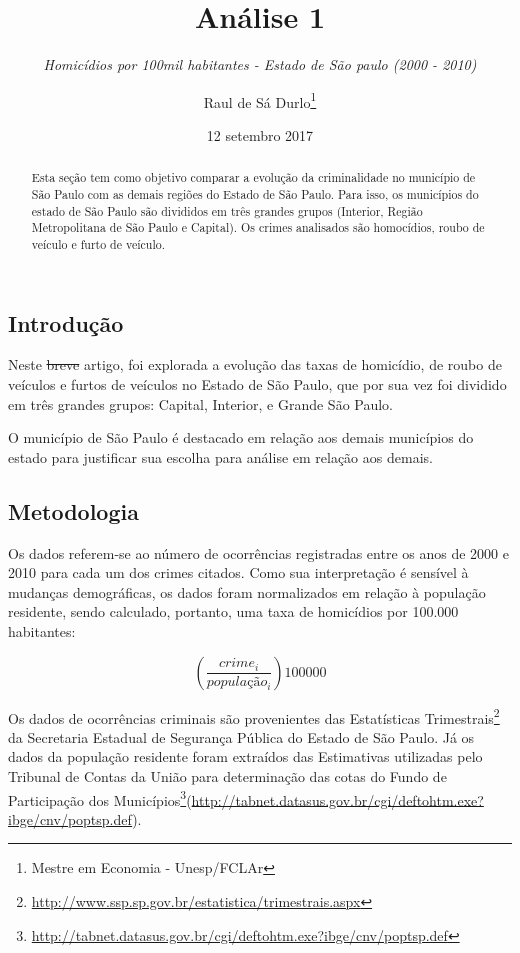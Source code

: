 \documentclass[]{article}
\title{Análise 1}
\subtitle{\emph{Homicídios por 100mil habitantes - Estado de São paulo (2000 -
2010)}}
\author{Raul de Sá Durlo\footnote{Mestre em Economia - Unesp/FCLAr}}
\date{12 setembro 2017}
\let\rmarkdownfootnote\footnote%
\def\footnote{\protect\rmarkdownfootnote}
\begin{document}
\maketitle
\begin{abstract}
Esta seção tem como objetivo comparar a evolução da criminalidade no
município de São Paulo com as demais regiões do Estado de São Paulo.
Para isso, os municípios do estado de São Paulo são divididos em três
grandes grupos (Interior, Região Metropolitana de São Paulo e Capital).
Os crimes analisados são homocídios, roubo de veículo e furto de
veículo.
\end{abstract}

\subsection{Introdução}\label{introducao}

Neste \sout{breve} artigo, foi explorada a evolução das taxas de
homicídio, de roubo de veículos e furtos de veículos no Estado de São
Paulo, que por sua vez foi dividido em três grandes grupos: Capital,
Interior, e Grande São Paulo.

O município de São Paulo é destacado em relação aos demais municípios do
estado para justificar sua escolha para análise em relação aos demais.

\subsection{Metodologia}\label{metodologia}

Os dados referem-se ao número de ocorrências registradas entre os anos
de 2000 e 2010 para cada um dos crimes citados. Como sua interpretação é
sensível à mudanças demográficas, os dados foram normalizados em relação
à população residente, sendo calculado, portanto, uma taxa de homicídios
por 100.000 habitantes:

\[\left(\frac{crime_i}{população_i}\right)100000\]

Os dados de ocorrências criminais são provenientes das Estatísticas
Trimestrais\footnote{\url{http://www.ssp.sp.gov.br/estatistica/trimestrais.aspx}}
da Secretaria Estadual de Segurança Pública do Estado de São Paulo. Já
os dados da população residente foram extraídos das Estimativas
utilizadas pelo Tribunal de Contas da União para determinação das cotas
do Fundo de Participação dos Municípios\footnote{\url{http://tabnet.datasus.gov.br/cgi/deftohtm.exe?ibge/cnv/poptsp.def}}(\url{http://tabnet.datasus.gov.br/cgi/deftohtm.exe?ibge/cnv/poptsp.def}).
\end{document}
